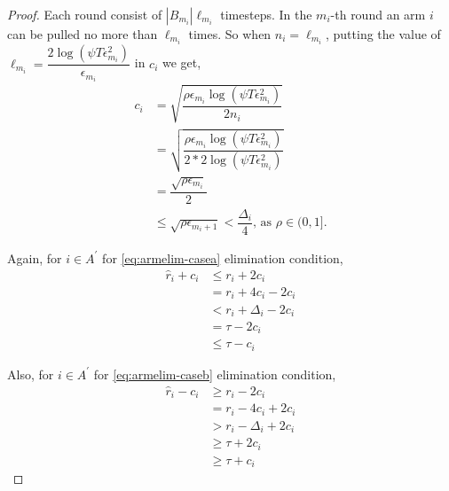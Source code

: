 \begin{proof}
Each round consist of $|B_{m_{i}}|\ell_{m_{i}}$ timesteps. In the $m_{i}$-th round an arm $i$ can be pulled no more than $\ell_{m_{i}}$ times. So when $n_{i}=\ell_{m_{i}}$, putting the value of $\ell_{m_{i}}=\dfrac{2\log{(\psi T\epsilon_{m_{i}}^{2})}}{\epsilon_{m_{i}}}$ in $c_{i}$ we get, 
\begin{align*}
c_{i}&=\sqrt{\dfrac{\rho\epsilon_{m_{i}}\log (\psi T\epsilon_{m_{i}}^{2})}{2 n_{i}}}\\
&=\sqrt{\dfrac{\rho\epsilon_{m_{i}}\log (\psi T\epsilon_{m_{i}}^{2})}{2*2 \log(\psi T\epsilon_{m_{i}}^{2})}}\\
& =\dfrac{\sqrt{\rho\epsilon_{m_{i}}}}{2}\\
& \leq \sqrt{\rho\epsilon_{m_{i}+1}} < \dfrac{\Delta_{i}}{4} \text{, as }\rho\in (0,1].
\end{align*}

Again, for ${i} \in A^{'}$ for \ref{eq:armelim-casea} elimination condition, 
\begin{align*}
\hat{r}_{i} + c_{i}&\leq r_{i} + 2c_{i} \\
&= r_{i} + 4c_{i} - 2c_{i} \\
&< r_{i} + \Delta_{i} - 2c_{i}\\
&= \tau -2c_{i} \\
&\leq \tau - c_{i}
\end{align*}

Also, for ${i} \in A^{'}$ for \ref{eq:armelim-caseb} elimination condition, 
\begin{align*}
\hat{r}_{i} - c_{i}&\geq r_{i} - 2c_{i} \\
&= r_{i} - 4c_{i} + 2c_{i} \\
&> r_{i} - \Delta_{i} + 2c_{i}\\
&\geq \tau + 2c_{i} \\
&\geq \tau + c_{i}
\end{align*}


\end{proof}
